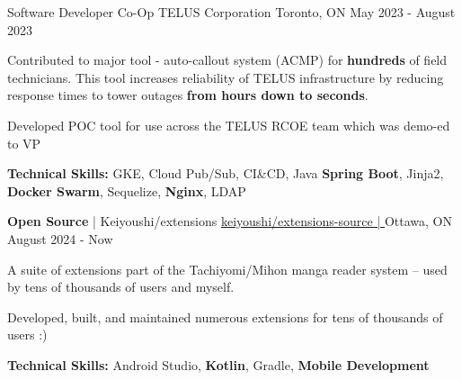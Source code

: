 \begin{cventries}
	\cventry
	{Software Developer Co-Op} %
	{TELUS Corporation} %
	{Toronto, ON} %
	{May 2023 - August 2023} %
	{
		\begin{cvitems} %
			\item {Contributed to major tool - auto-callout system (ACMP) for \textbf{hundreds} of field technicians. This tool increases reliability of TELUS infrastructure by reducing response times to tower outages \textbf{from hours down to seconds}.}
			\item {Developed POC tool for use across the TELUS RCOE team which was demo-ed to VP}
			\item[] {\textbf{Technical Skills:} GKE, Cloud Pub/Sub, CI\&CD, Java \textbf{Spring Boot}, Jinja2, \textbf{Docker Swarm}, Sequelize, \textbf{Nginx}, LDAP}
		\end{cvitems}
	}

  \cventry
  {\textbf{Open Source} | Keiyoushi/extensions} %
	{\underline{\href{https://github.com/keiyoushi/extensions-source}{keiyoushi/extensions-source | \ExternalLink}}} %
	{Ottawa, ON} %
	{August 2024 - Now} %
	{
		\begin{cvitems} %
      \item {A suite of extensions part of the Tachiyomi/Mihon manga reader system -- used by tens of thousands of users and myself.}
      \item {Developed, built, and maintained numerous extensions for tens of thousands of users :)}
      \item[] {\textbf{Technical Skills:} Android Studio, \textbf{Kotlin}, Gradle, \textbf{Mobile Development}}
		\end{cvitems}
	}


\end{cventries}
